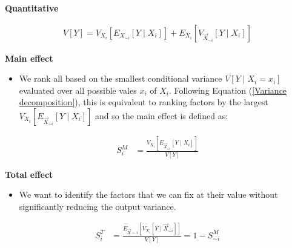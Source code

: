 \begin{frame}\begin{center}
		\LARGE\textbf{Quantitative}
\end{center}\end{frame}
\begin{frame}
	\begin{align}\label{Variance decomposition}
	V[Y] = V_{X_i}[E_{X_{\sim i}}[Y\mid X_i]] + E_{X_i}[V_{\vec{X}_{\sim i}}[Y\mid X_i]]
	\end{align}
\end{frame}
\begin{frame}\textbf{Main effect}\vspace{0.3cm}

\begin{itemize}\setlength\itemsep{1em}
\item We rank all based on the smallest conditional variance $V[Y \mid X_i = x_i]$ evaluated over all possible vales $x_i$ of $X_i$. Following Equation (\ref{Variance decomposition}), this is equivalent to ranking factors by the largest
$V_{X_i}[E_{\vec{X}_{\sim i}}[Y\mid X_i]]$ and so the main effect is defined as:
\end{itemize}

\begin{align*}
S^M_i & = \frac{V_{X_i}[E_{\vec{X}_{\sim i}}[Y\mid X_i]]}{V[Y]}
\end{align*}
\end{frame}

\begin{frame}\textbf{Total effect}\vspace{0.3cm}

\begin{itemize}
\item We want to identify the factors that we can fix at their value without significantly reducing the output variance. 
\end{itemize}

\begin{align*}
S^T_i & = \frac{E_{\vec{X} \sim i}[V_{X_i}[Y \mid \vec{X}_{\sim i}]]}{V[Y]} = 1 - S^M_{\sim i}
\end{align*}

\end{frame}
